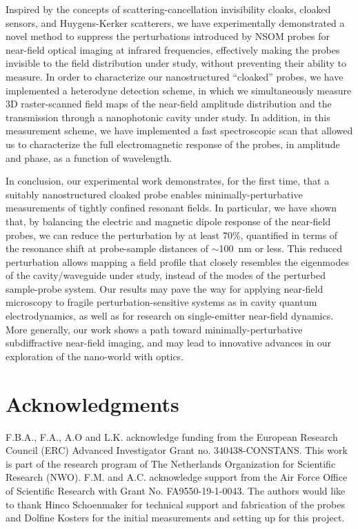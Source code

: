 \documentclass{osa-article}
\begin{document}
	Inspired by the concepts of scattering-cancellation invisibility cloaks, cloaked sensors, and Huygens-Kerker scatterers, we have experimentally demonstrated a novel method to suppress the perturbations introduced by NSOM probes for near-field optical imaging at infrared frequencies, effectively making the probes invisible to the field distribution under study, without preventing their ability to measure. In order to characterize our nanostructured ``cloaked'' probes, we have implemented a heterodyne detection scheme, in which we simultaneously measure 3D raster-scanned field maps of the near-field amplitude distribution and the transmission through a nanophotonic cavity under study. In addition, in this measurement scheme, we have implemented a fast spectroscopic scan that allowed us to characterize the full electromagnetic response of the probes, in amplitude and phase, as a function of wavelength. 
	
	In conclusion, our experimental work demonstrates, for the first time, that a suitably nanostructured cloaked probe enables minimally-perturbative measurements of tightly confined resonant fields. In particular, we have shown that, by balancing the electric and magnetic dipole response of the near-field probes, we can reduce the perturbation by at least 70\%, quantified in terms of the resonance shift at probe-sample distances of $\sim$100~nm or less. This reduced perturbation allows mapping a field profile that closely resembles the eigenmodes of the cavity/waveguide under study, instead of the modes of the perturbed sample-probe system. Our results may pave the way for applying near-field microscopy to fragile perturbation-sensitive systems as in cavity quantum electrodynamics, as well as for research on single-emitter near-field dynamics. More generally, our work shows a path toward minimally-perturbative subdiffractive near-field imaging, and may lead to innovative advances in our exploration of the nano-world with optics.
	
	
	\section*{Acknowledgments}
	F.B.A., F.A., A.O and L.K. acknowledge funding from the European Research Council (ERC) Advanced Investigator Grant no. 340438-CONSTANS. This work is part of the research program of The Netherlands Organization for Scientific Research (NWO). F.M. and A.C. acknowledge support from the Air Force Office of Scientific Research with Grant No. FA9550-19-1-0043. The authors would like to thank Hinco Schoenmaker for technical support and fabrication of the probes and Dolfine Kosters for the initial measurements and setting up for this project.
	
\end{document}

